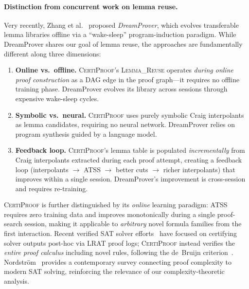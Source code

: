\documentclass[acmtocl,review,anonymous]{acmart}
\newcommand{\CP}{\textsc{CertiProof}}
\newcommand{\ATSS}{\textsc{ATSS}}
\begin{document}
\paragraph{Distinction from concurrent work on lemma reuse.}
Very recently, Zhang et al.~\cite{DreamProver2026} proposed
\emph{DreamProver}, which evolves transferable lemma libraries
offline via a ``wake-sleep'' program-induction paradigm.
While DreamProver shares our goal of lemma reuse, the approaches
are fundamentally different along three dimensions:
\begin{enumerate}
  \item \textbf{Online vs.\ offline.}  \CP{}'s \textsc{Lemma\_Reuse}
    operates \emph{during online proof construction} as a DAG edge in
    the proof graph---it requires no offline training phase.  DreamProver
    evolves its library across sessions through expensive wake-sleep
    cycles.
  \item \textbf{Symbolic vs.\ neural.}  \CP{} uses purely symbolic
    Craig interpolants as lemma candidates, requiring no neural network.
    DreamProver relies on program synthesis guided by a language model.
  \item \textbf{Feedback loop.}  \CP{}'s lemma table is populated
    \emph{incrementally} from Craig interpolants extracted during each
    proof attempt, creating a feedback loop (interpolants $\to$ ATSS
    $\to$ better cuts $\to$ richer interpolants) that improves
    within a single session.  DreamProver's improvement is
    cross-session and requires re-training.
\end{enumerate}

\noindent
\CP{} is further distinguished by its \emph{online} learning paradigm:
\ATSS{} requires zero training data and improves monotonically during
a single proof-search session, making it applicable to \emph{arbitrary}
novel formula families from the first interaction.  Recent verified
SAT solver efforts~\cite{LammichLRAT2024,FleuryVerifiedSAT2025}
have focused on certifying solver outputs post-hoc via LRAT proof
logs; \CP{} instead verifies the \emph{entire proof calculus}
including novel rules, following the de~Bruijn
criterion~\cite{Harrison2009}.  Nordstr\"{o}m~\cite{NordstromProofComplexity2025}
provides a contemporary survey connecting proof complexity to modern
SAT solving, reinforcing the relevance of our complexity-theoretic
analysis.
\end{document}
